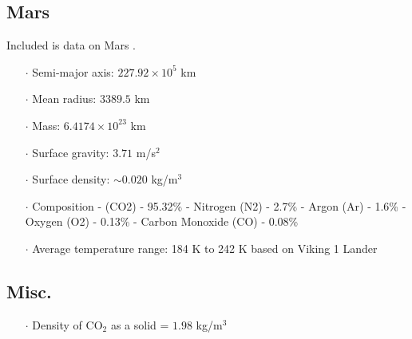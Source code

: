 \documentclass[a4paper]{article}
\begin{document}
	\subsection{Mars}
    Included is data on Mars \cite{nasa_mars_????}.
	\begin{itemize}
		\item[$\cdot$] Semi-major axis: $227.92 \times 10^5$ km
		\item[$\cdot$] Mean radius: $3389.5$ km
		\item[$\cdot$] Mass: $6.4174 \times 10^{23}$ km
		\item[$\cdot$] Surface gravity: $3.71$ m/s$^2$
		\item[$\cdot$] Surface density: $\sim 0.020$ kg/m$^3$
		\item[$\cdot$] Composition
		\subitem- (CO2) - 95.32\%
		\subitem- Nitrogen (N2) - 2.7\%
		\subitem- Argon (Ar) - 1.6\%
		\subitem- Oxygen (O2) - 0.13\%
		\subitem- Carbon Monoxide (CO) - 0.08\%
		\item[$\cdot$] Average temperature range: 184 K to 242 K based on Viking 1 Lander
	\end{itemize}
	
	\subsection{Misc.}
	\begin{itemize}
		\item[$\cdot$] Density of CO$_2$ as a solid = $1.98$ kg/m$^3$ \cite{wolfram_alpha_llc_wolframalpha_2015}
	\end{itemize}
	
  \clearpage
  
  
\end{document}
